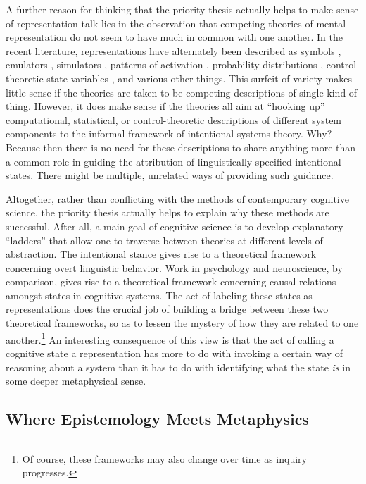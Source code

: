 A further reason for thinking that the priority thesis actually helps to make sense of representation-talk lies in the observation that competing theories of mental representation do not seem to have much in common with one another. In the recent literature, representations have alternately been described as symbols \citep{Fodor:1998}, emulators \citep{Grush:2004}, simulators \citep{Barsalou:1999}, patterns of activation \citep{McClelland:2010}, probability distributions \citep{Goodman:2015}, control-theoretic state variables \citep{Eliasmith:2003,Eliasmith:2013}, and various other things. This surfeit of variety makes little sense if the theories are taken to be competing descriptions of single kind of thing. However, it does make sense if the theories all aim at ``hooking up'' computational, statistical, or control-theoretic descriptions of different system components to the informal framework of intentional systems theory. Why? Because then there is no need for these descriptions to share anything more than a common role in guiding the attribution of linguistically specified intentional states. There might be multiple, unrelated ways of providing such guidance.

Altogether, rather than conflicting with the methods of contemporary cognitive science, the priority thesis actually helps to explain why these methods are successful. After all, a main goal of cognitive science is to develop explanatory ``ladders'' that allow one to traverse between theories at different levels of abstraction. The intentional stance gives rise to a theoretical framework concerning overt linguistic behavior. Work in psychology and neuroscience, by comparison, gives rise to a theoretical framework concerning causal relations amongst states in cognitive systems. The act of labeling these states as representations does the crucial job of building a bridge between these two theoretical frameworks, so as to lessen the mystery of how they are related to one another.\footnote{Of course, these frameworks may also change over time as inquiry progresses.} An interesting consequence of this view is that the act of calling a cognitive state a representation has more to do with invoking a certain way of reasoning about a system than it has to do with identifying what the state \textit{is} in some deeper metaphysical sense.

\subsection{Where Epistemology Meets Metaphysics}

